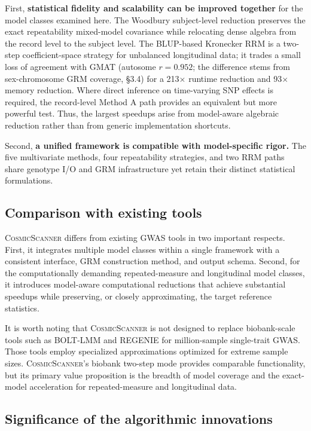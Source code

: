 \documentclass[11pt,a4paper]{article}
\newcommand{\CosmicScanner}{\textsc{CosmicScanner}}
\begin{document}
First, \textbf{statistical fidelity and scalability can be improved together} for the model classes examined here. The Woodbury subject-level reduction preserves the exact repeatability mixed-model covariance while relocating dense algebra from the record level to the subject level. The BLUP-based Kronecker RRM is a two-step coefficient-space strategy for unbalanced longitudinal data; it trades a small loss of agreement with GMAT (autosome $r=0.952$; the difference stems from sex-chromosome GRM coverage, \S3.4) for a 213$\times$ runtime reduction and 93$\times$ memory reduction. Where direct inference on time-varying SNP effects is required, the record-level Method A path provides an equivalent but more powerful test. Thus, the largest speedups arise from model-aware algebraic reduction rather than from generic implementation shortcuts.

Second, \textbf{a unified framework is compatible with model-specific rigor.} The five multivariate methods, four repeatability strategies, and two RRM paths share genotype I/O and GRM infrastructure yet retain their distinct statistical formulations.

\subsection{Comparison with existing tools}

\CosmicScanner{} differs from existing GWAS tools in two important respects. First, it integrates multiple model classes within a single framework with a consistent interface, GRM construction method, and output schema. Second, for the computationally demanding repeated-measure and longitudinal model classes, it introduces model-aware computational reductions that achieve substantial speedups while preserving, or closely approximating, the target reference statistics.

It is worth noting that \CosmicScanner{} is not designed to replace biobank-scale tools such as BOLT-LMM and REGENIE for million-sample single-trait GWAS. Those tools employ specialized approximations optimized for extreme sample sizes. \CosmicScanner's biobank two-step mode provides comparable functionality, but its primary value proposition is the breadth of model coverage and the exact-model acceleration for repeated-measure and longitudinal data.

\subsection{Significance of the algorithmic innovations}
\end{document}
